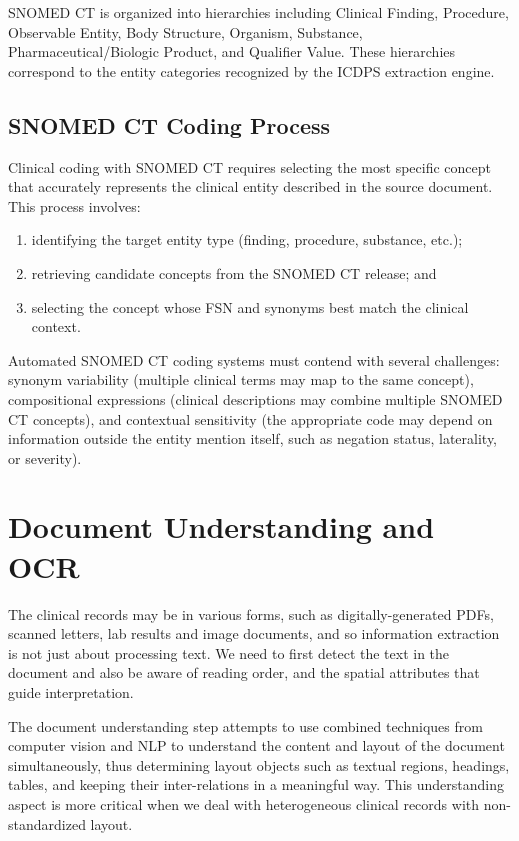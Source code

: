 SNOMED CT is organized into hierarchies including Clinical Finding, Procedure, Observable Entity, Body Structure, Organism, Substance, Pharmaceutical/Biologic Product, and Qualifier Value. These hierarchies correspond to the entity categories recognized by the ICDPS extraction engine.

\subsection{SNOMED CT Coding Process}
Clinical coding with SNOMED CT requires selecting the most specific concept that accurately represents the clinical entity described in the source document. This process involves:
\begin{enumerate}
    \item[(i)] identifying the target entity type (finding, procedure, substance, etc.);
    \item[(ii)] retrieving candidate concepts from the SNOMED CT release; and
    \item[(iii)] selecting the concept whose FSN and synonyms best match the clinical context.
\end{enumerate}

Automated SNOMED CT coding systems must contend with several challenges: synonym variability (multiple clinical terms may map to the same concept), compositional expressions (clinical descriptions may combine multiple SNOMED CT concepts), and contextual sensitivity (the appropriate code may depend on information outside the entity mention itself, such as negation status, laterality, or severity).

\section{Document Understanding and OCR}

The clinical records may be in various forms, such as digitally-generated PDFs, scanned letters, lab results and image documents, and so information extraction is not just about processing text. We need to first detect the text in the document and also be aware of reading order, and the spatial attributes that guide interpretation.

The document understanding step attempts to use combined techniques from computer vision and NLP to understand the content and layout of the document simultaneously, thus determining layout objects such as textual regions, headings, tables, and keeping their inter-relations in a meaningful way. This understanding aspect is more critical when we deal with heterogeneous clinical records with non-standardized layout.

